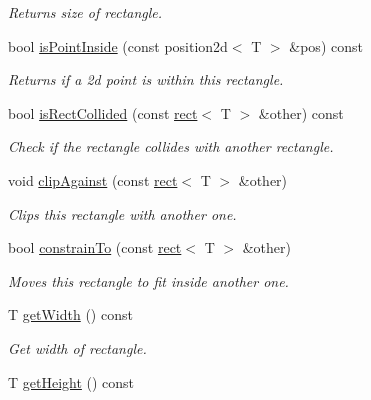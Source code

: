 \begin{DoxyCompactItemize}
\begin{DoxyCompactList}\small\item\em Returns size of rectangle. \end{DoxyCompactList}\item 
bool \hyperlink{classirr_1_1core_1_1rect_a3276400775d230f377ff1e2755cbb4ef}{is\+Point\+Inside} (const position2d$<$ T $>$ \&pos) const 
\begin{DoxyCompactList}\small\item\em Returns if a 2d point is within this rectangle. \end{DoxyCompactList}\item 
bool \hyperlink{classirr_1_1core_1_1rect_abb2b27935e617dfad6445b2f25f7513d}{is\+Rect\+Collided} (const \hyperlink{classirr_1_1core_1_1rect}{rect}$<$ T $>$ \&other) const 
\begin{DoxyCompactList}\small\item\em Check if the rectangle collides with another rectangle. \end{DoxyCompactList}\item 
void \hyperlink{classirr_1_1core_1_1rect_a86645d45a8bed1a3539bba9865e93de4}{clip\+Against} (const \hyperlink{classirr_1_1core_1_1rect}{rect}$<$ T $>$ \&other)
\begin{DoxyCompactList}\small\item\em Clips this rectangle with another one. \end{DoxyCompactList}\item 
bool \hyperlink{classirr_1_1core_1_1rect_a4515d2a1349dc805775854a422465f63}{constrain\+To} (const \hyperlink{classirr_1_1core_1_1rect}{rect}$<$ T $>$ \&other)
\begin{DoxyCompactList}\small\item\em Moves this rectangle to fit inside another one. \end{DoxyCompactList}\item 
T \hyperlink{classirr_1_1core_1_1rect_ae313a3674095733348d5e8bcb75c49b4}{get\+Width} () const \hypertarget{classirr_1_1core_1_1rect_ae313a3674095733348d5e8bcb75c49b4}{}\label{classirr_1_1core_1_1rect_ae313a3674095733348d5e8bcb75c49b4}

\begin{DoxyCompactList}\small\item\em Get width of rectangle. \end{DoxyCompactList}\item 
T \hyperlink{classirr_1_1core_1_1rect_a61b4192aa7aee5b55c288b1eac29d76b}{get\+Height} () const \hypertarget{classirr_1_1core_1_1rect_a61b4192aa7aee5b55c288b1eac29d76b}{}\label{classirr_1_1core_1_1rect_a61b4192aa7aee5b55c288b1eac29d76b}


\end{DoxyCompactItemize}

